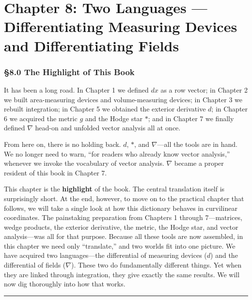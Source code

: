 \hypertarget{chapter-8-two-languages-differentiating-measuring-devices-and-differentiating-fields}{%
\chapter{Chapter 8: Two Languages --- Differentiating Measuring Devices
and Differentiating
Fields}\label{chapter-8-two-languages-differentiating-measuring-devices-and-differentiating-fields}}

\hypertarget{the-highlight-of-this-book}{%
\subsection{§8.0 The Highlight of This
Book}\label{the-highlight-of-this-book}}

It has been a long road. In Chapter 1 we defined \(dx\) as a row vector;
in Chapter 2 we built area-measuring devices and volume-measuring
devices; in Chapter 3 we rebuilt integration; in Chapter 5 we obtained
the exterior derivative \(d\); in Chapter 6 we acquired the metric \(g\)
and the Hodge star \(\ast\); and in Chapter 7 we finally defined
\(\nabla\) head-on and unfolded vector analysis all at once.

From here on, there is no holding back. \(d\), \(\ast\), and
\(\nabla\)---all the tools are in hand. We no longer need to warn, ``for
readers who already know vector analysis,'' whenever we invoke the
vocabulary of vector analysis. \(\nabla\) became a proper resident of
this book in Chapter 7.

This chapter is the \textbf{highlight} of the book. The central
translation itself is surprisingly short. At the end, however, to move
on to the practical chapter that follows, we will take a single look at
how this dictionary behaves in curvilinear coordinates. The painstaking
preparation from Chapters 1 through 7---matrices, wedge products, the
exterior derivative, the metric, the Hodge star, and vector
analysis---was all for that purpose. Because all these tools are now
assembled, in this chapter we need only ``translate,'' and two worlds
fit into one picture. We have acquired two languages---the differential
of measuring devices (\(d\)) and the differential of fields
(\(\nabla\)). These two do fundamentally different things. Yet when they
are linked through integration, they give exactly the same results. We
will now dig thoroughly into how that works.

\begin{center}\rule{0.5\linewidth}{0.5pt}\end{center}

